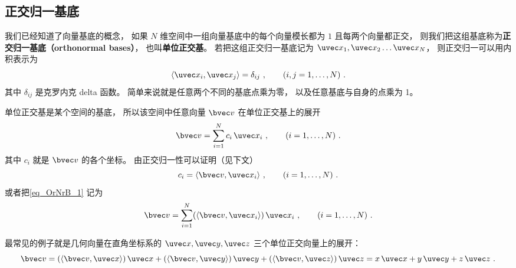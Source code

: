 
\begin{issues}
\issueDraft
\end{issues}


\subsection{正交归一基底}

我们已经知道了向量基底的概念， 如果 $N$ 维空间中一组向量基底中的每个向量模长都为 $1$ 且每两个向量都正交， 则我们把这组基底称为\textbf{正交归一基底（orthonormal bases）}， 也叫\textbf{单位正交基}。 若把这组正交归一基底记为 $\uvec x_1,\uvec x_2\dots\uvec x_N$， 则正交归一可以用内积表示为
\begin{equation}\label{eq_OrNrB_3}
\langle \uvec x_i, \uvec x_j \rangle = \delta_{ij} ~,\qquad (i,j = 1,\dots, N)~.
\end{equation}
其中 $\delta_{ij}$ 是克罗内克 delta 函数。 简单来说就是任意两个不同的基底点乘为零， 以及任意基底与自身的点乘为 1。

单位正交基是某个空间的基底， 所以该空间中任意向量 $\bvec v$ 在单位正交基上的展开
\begin{equation}\label{eq_OrNrB_1}
\bvec v = \sum_{i = 1}^N c_i \,\uvec x_i ~,\qquad (i = 1,\dots, N)~.
\end{equation}
其中 $c_i$ 就是 $\bvec v$ 的各个坐标。 由正交归一性可以证明（见下文）
\begin{equation}\label{eq_OrNrB_4}
c_i = \langle \bvec v, \uvec x_i \rangle ~,\qquad (i = 1,\dots, N)~.
\end{equation}
或者把\autoref{eq_OrNrB_1} 记为
\begin{equation}\label{eq_OrNrB_5}
\bvec v = \sum_{i = 1}^N (\langle \bvec v, \uvec x_i \rangle) \,\uvec x_i~, \qquad (i = 1,\dots, N)~.
\end{equation}

最常见的例子就是几何向量在直角坐标系的 $\uvec x, \uvec y, \uvec z$ 三个单位正交向量上的展开：
\begin{equation}
\bvec v = (\langle \bvec v, \uvec x \rangle)\,\uvec x + (\langle \bvec v, \uvec y \rangle)\,\uvec y + (\langle \bvec v, \uvec z \rangle)\,\uvec z = x \,\uvec x + y \,\uvec y + z \,\uvec z~.
\end{equation} 

